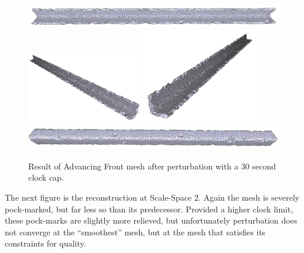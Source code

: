 \documentclass[12pt]{drexelthesis}
\begin{document}
\begin{figure}[!ht]
	\centering
		\includegraphics[width=5in]{simulated-lab-scan/0noise/optimizedNeat/advancingfrontperturb00.png}
		\includegraphics[width=2in]{simulated-lab-scan/0noise/optimizedNeat/advancingfrontperturb01.png}
		\includegraphics[width=2in]{simulated-lab-scan/0noise/optimizedNeat/advancingfrontperturb02.png}
		\includegraphics[width=5in]{simulated-lab-scan/0noise/optimizedNeat/advancingfrontperturb03.png}
		\caption[Advancing Front mesh after perturbation with a 30 second clock cap]{\centering  Result of Advancing Front mesh after perturbation with a 30 second clock cap.}
	\label{zeronoise:advancedperturb}
\end{figure}

The next figure is the reconstruction at Scale-Space $2$. Again the mesh is severely pock-marked, but far less so than its predecessor. Provided a higher clock limit, these pock-marks are slightly more relieved, but unfortunately perturbation does not converge at the ``smoothest'' mesh, but at the mesh that satisfies its constraints for quality.
\end{document}
